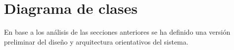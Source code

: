 \chapter{Diagrama de clases}
\label{ch:analisis_diagrama_clases}

En base a los análisis de las secciones anteriores se ha definido una versión preliminar del diseño y arquitectura orientativos del sistema.



